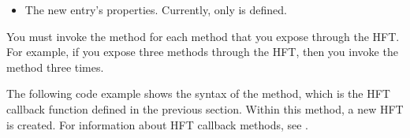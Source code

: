 \documentclass[letterpaper,12pt,english,openany,oneside]{sphinxmanual}
\begin{document}
\begin{sphinxVerbatim}[commandchars=\\\{\}]
\end{sphinxVerbatim}
\begin{itemize}
\item {} 
The new entry’s properties. Currently, only  is defined.

\end{itemize}

You must invoke the  method for each method that you expose through the HFT. For example, if you expose three methods through the HFT, then you invoke the  method three times.

The following code example shows the syntax of the  method, which is the HFT callback function defined in the previous section. Within this method, a new HFT is created. For information about HFT callback methods, see .
\end{document}
